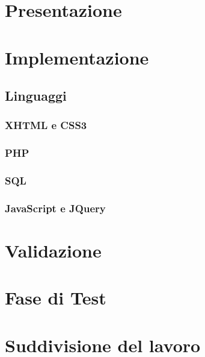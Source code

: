 \documentclass[a4paper, oneside, openany, dvipsnames, table]{article}
\begin{document}
\section{Presentazione}
	
\newpage
\section{Implementazione}
	
	\subsection{Linguaggi}
		
		\subsubsection{XHTML e CSS3}
			
		\subsubsection{PHP}
			
		\subsubsection{SQL}
			
		\subsubsection{JavaScript e JQuery}
\newpage
\section{Validazione}
	
\newpage
\section{Fase di Test}
	
\newpage
\section{Suddivisione del lavoro}
	
\end{document}
